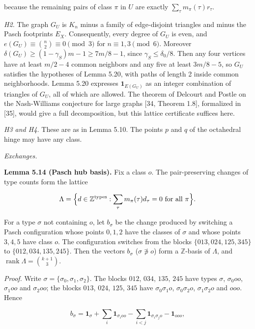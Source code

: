 \documentclass[english,11pt,a4paper]{article}
\begin{document}
because the remaining pairs of class \(\pi\) in \(U\) are exactly \(\sum_\tau m_\pi(\tau)r_\tau\).

\emph{H2.} The graph \(G_U\) is \(K_n\) minus a family of edge-disjoint triangles and minus the Pasch footprints \(E_X\). Consequently, every degree of \(G_U\) is even, and \(e(G_U)\equiv\binom{n}{2}\equiv0\pmod 3\) for \(n\equiv1,3\pmod 6\). Moreover \(\delta(G_U)\ge(1-\gamma_S)m-1\ge7m/8-1\), since \(\gamma_S\le\delta_0/8\). Then any four vertices have at least \(m/2-4\) common neighbors and any five at least \(3m/8-5\), so \(G_U\) satisfies the hypotheses of Lemma 5.20, with paths of length 2 inside common neighborhoods. Lemma 5.20 expresses \(\mathbf 1_{E(G_U)}\) as an integer combination of triangles of \(G_U\), all of which are allowed. The theorem of Delcourt and Postle on the Nash-Williams conjecture for large graphs {[}34, Theorem 1.8{]}, formalized in {[}35{]}, would give a full decomposition, but this lattice certificate suffices here.

\emph{H3 and H4.} These are as in Lemma 5.10. The points \(p\) and \(q\) of the octahedral hinge may have any class.

\emph{Exchanges.}

\textbf{Lemma 5.14 (Pasch hub basis).} Fix a class \(o\). The pair-preserving changes of type counts form the lattice

\nopagebreak[4]
\[\Lambda=\Bigl\{d\in\mathbb Z^{\mathrm{types}}:\sum_\tau m_\pi(\tau)d_\tau=0\text{ for all }\pi\Bigr\}.\]

For a type \(\sigma\) not containing \(o\), let \(b_\sigma\) be the change produced by switching a Pasch configuration whose points \(0,1,2\) have the classes of \(\sigma\) and whose points \(3,4,5\) have class \(o\). The configuration switches from the blocks \(\{013,024,125,345\}\) to \(\{012,034,135,245\}\). Then the vectors \(b_\sigma\) (\(\sigma\not\ni o\)) form a \(\mathbb Z\)-basis of \(\Lambda\), and \(\operatorname{rank}\Lambda=\binom{k+1}{3}\).

\emph{Proof.} Write \(\sigma=\{\sigma_0,\sigma_1,\sigma_2\}\). The blocks \(012\), \(034\), \(135\), \(245\) have types \(\sigma\), \(\sigma_0oo\), \(\sigma_1oo\) and \(\sigma_2oo\); the blocks \(013\), \(024\), \(125\), \(345\) have \(\sigma_0\sigma_1o\), \(\sigma_0\sigma_2o\), \(\sigma_1\sigma_2o\) and \(ooo\). Hence

\nopagebreak[4]
\[b_\sigma=\mathbf 1_\sigma+\sum_i\mathbf 1_{\sigma_ioo}-\sum_{i<j}\mathbf 1_{\sigma_i\sigma_jo}-\mathbf 1_{ooo},\]
\end{document}
